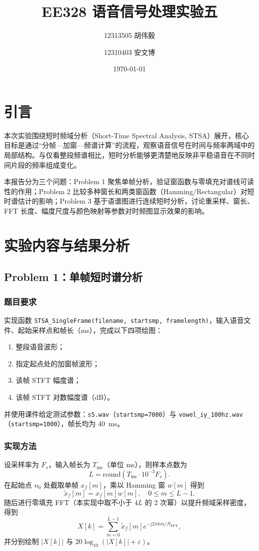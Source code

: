 \documentclass[12pt,a4paper]{ctexart}
\title{\vspace{-1.2cm}EE328 语音信号处理实验五\\}
\author{
    12313505 胡伟毅\and
    12310403 安文博
}
\date{\today}
\begin{document}
\maketitle
\thispagestyle{empty}

\section{引言}
本次实验围绕短时频域分析（Short-Time Spectral Analysis, STSA）展开，核心目标是通过“分帧—加窗—频谱计算”的流程，观察语音信号在时间与频率两域中的局部结构。与仅看整段频谱相比，短时分析能够更清楚地反映非平稳语音在不同时间片段的频率组成变化。

本报告分为三个问题：Problem 1 聚焦单帧分析，验证窗函数与零填充对谱线可读性的作用；Problem 2 比较多种窗长和两类窗函数（Hamming/Rectangular）对短时谱估计的影响；Problem 3 基于语谱图进行连续短时分析，讨论重采样、窗长、FFT 长度、幅度尺度与颜色映射等参数对时频图显示效果的影响。

\section{实验内容与结果分析}

\subsection{Problem 1：单帧短时谱分析}
\subsubsection*{题目要求}
实现函数 \texttt{STSA\_SingleFrame(filename, startsmp, framelength)}，输入语音文件、起始采样点和帧长（ms），完成以下四项绘图：
\begin{enumerate}
    \item 整段语音波形；
    \item 指定起点处的加窗帧波形；
    \item 该帧 STFT 幅度谱；
    \item 该帧 STFT 对数幅度谱（dB）。
\end{enumerate}
并使用课件给定测试参数：\texttt{s5.wav}（\texttt{startsmp=7000}）与 \texttt{vowel\_iy\_100hz.wav}（\texttt{startsmp=1000}），帧长均为 \SI{40}{ms}。

\subsubsection*{实现方法}
设采样率为 $F_s$，输入帧长为 $T_{\text{ms}}$（单位 ms），则样本点数为
\begin{equation}
L = \mathrm{round}(T_{\text{ms}}\cdot 10^{-3}F_s).
\end{equation}
在起始点 $n_0$ 处截取单帧 $x_f[m]$，乘以 Hamming 窗 $w[m]$ 得到
\begin{equation}
\tilde{x}_f[m] = x_f[m]w[m],\quad 0\le m\le L-1.
\end{equation}
随后进行零填充 FFT（本实现中取不小于 $4L$ 的 2 次幂）以提升频域采样密度，得到
\begin{equation}
X[k] = \sum_{m=0}^{L-1}\tilde{x}_f[m]e^{-j2\pi km/N_{\text{FFT}}},
\end{equation}
并分别绘制 $|X[k]|$ 与 $20\log_{10}(|X[k]|+\varepsilon)$。
\end{document}
